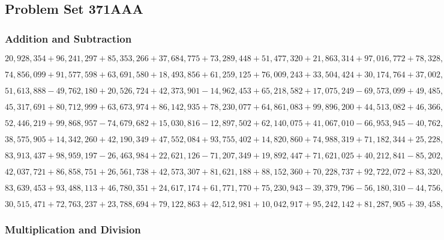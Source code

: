 \hypertarget{problem-set-371aaa}{%
\subsection{Problem Set 371AAA}\label{problem-set-371aaa}}

\hypertarget{addition-and-subtraction}{%
\subsubsection{Addition and
Subtraction}\label{addition-and-subtraction}}

\(20,928,354+96,241,297+85,353,266+37,684,775+73,289,448+51,477,320+21,863,314+97,016,772+78,328,965+35,936,031\)

\(74,856,099+91,577,598+63,691,580+18,493,856+61,259,125+76,009,243+33,504,424+30,174,764+37,002,963+43,322,297\)

\(51,613,888-49,762,180+20,526,724+42,373,901-14,962,453+65,218,582+17,075,249-69,573,099+49,485,532-63,506,686\)

\(45,317,691+80,712,999+63,673,974+86,142,935+78,230,077+64,861,083+99,896,200+44,513,082+46,366,809+38,194,919\)

\(52,446,219+99,868,957-74,679,682+15,030,816-12,897,502+62,140,075+41,067,010-66,953,945-40,762,790+17,306,502\)

\(38,575,905+14,342,260+42,190,349+47,552,084+93,755,402+14,820,860+74,988,319+71,182,344+25,228,167+44,618,781\)

\(83,913,437+98,959,197-26,463,984+22,621,126-71,207,349+19,892,447+71,621,025+40,212,841-85,202,23÷74,562,539\)

\(42,037,721+86,858,751+26,561,738+42,573,307+81,621,188+88,152,360+70,228,737+92,722,072+83,320,242+81,398,079\)

\(83,639,453+93,488,113+46,780,351+24,617,174+61,771,770+75,230,943-39,379,796-56,180,310-44,756,850-16,122,391\)

\(30,515,471+72,763,237+23,788,694+79,122,863+42,512,981+10,042,917+95,242,142+81,287,905+39,458,308+72,420,024\)

\hypertarget{multiplication-and-division}{%
\subsubsection{Multiplication and
Division}\label{multiplication-and-division}}

